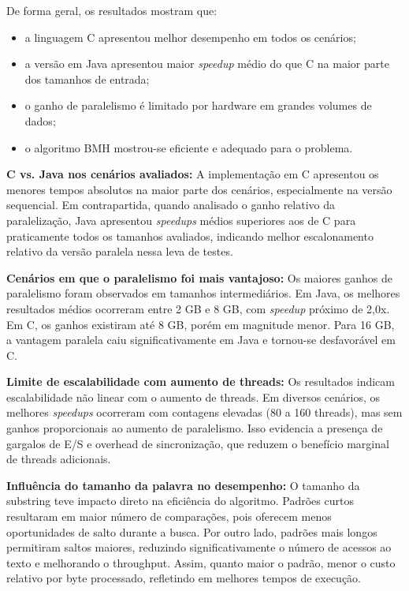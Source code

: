 \documentclass[10pt,twocolumn,a4paper]{article}
\begin{document}
De forma geral, os resultados mostram que:

\begin{itemize}
    \item a linguagem C apresentou melhor desempenho em todos os cenários;
    \item a versão em Java apresentou maior \textit{speedup} médio do que C na maior parte dos tamanhos de entrada;
    \item o ganho de paralelismo é limitado por hardware em grandes volumes de dados;
    \item o algoritmo BMH mostrou-se eficiente e adequado para o problema.
\end{itemize}

\textbf{C vs. Java nos cenários avaliados:}
A implementação em C apresentou os menores tempos absolutos na maior parte dos cenários, especialmente na versão sequencial. Em contrapartida, quando analisado o ganho relativo da paralelização, Java apresentou \textit{speedups} médios superiores aos de C para praticamente todos os tamanhos avaliados, indicando melhor escalonamento relativo da versão paralela nessa leva de testes.

\textbf{Cenários em que o paralelismo foi mais vantajoso:}
Os maiores ganhos de paralelismo foram observados em tamanhos intermediários. Em Java, os melhores resultados médios ocorreram entre 2 GB e 8 GB, com \textit{speedup} próximo de 2,0x. Em C, os ganhos existiram até 8 GB, porém em magnitude menor. Para 16 GB, a vantagem paralela caiu significativamente em Java e tornou-se desfavorável em C.

\textbf{Limite de escalabilidade com aumento de threads:}
Os resultados indicam escalabilidade não linear com o aumento de threads. Em diversos cenários, os melhores \textit{speedups} ocorreram com contagens elevadas (80 a 160 threads), mas sem ganhos proporcionais ao aumento de paralelismo. Isso evidencia a presença de gargalos de E/S e overhead de sincronização, que reduzem o benefício marginal de threads adicionais.

\textbf{Influência do tamanho da palavra no desempenho:}
O tamanho da substring teve impacto direto na eficiência do algoritmo. Padrões curtos resultaram em maior número de comparações, pois oferecem menos oportunidades de salto durante a busca. Por outro lado, padrões mais longos permitiram saltos maiores, reduzindo significativamente o número de acessos ao texto e melhorando o throughput. Assim, quanto maior o padrão, menor o custo relativo por byte processado, refletindo em melhores tempos de execução.
\end{document}
